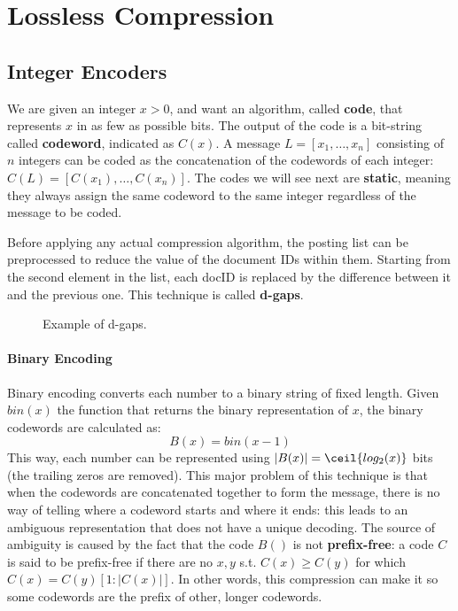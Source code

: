 \section{Lossless Compression}

\subsection{Integer Encoders}

We are given an integer $x > 0$, and want an algorithm, called \textbf{code}, that represents $x$ in as few as possible bits. The output of the code is a bit-string called \textbf{codeword}, indicated as $C(x)$. A message $L = [x_1, \dots , x_n]$ consisting of $n$ integers can be coded as the concatenation of the codewords of each integer: $C(L) = [C(x_1), \dots, C(x_n)]$. The codes we will see next are \textbf{static}, meaning they always assign the same codeword to the same integer regardless of the message to be coded.

Before applying any actual compression algorithm, the posting list can be preprocessed to reduce the value of the document IDs within them. Starting from the second element in the list, each docID is replaced by the difference between it and the previous one. This technique is called \textbf{d-gaps}.
\begin{figure}[!ht]
    \centering 
     
    \caption{Example of d-gaps.}
    \label{fig:dgaps}
\end{figure}

\paragraph{Binary Encoding}
Binary encoding converts each number to a binary string of fixed length. Given $\textit{bin}(x)$ the function that returns the binary representation of $x$, the binary codewords are calculated as:
\begin{equation*}
    B(x) = \textit{bin}(x-1)
\end{equation*}
This way, each number can be represented using $|B(x)| = \ceil{log_2(x)}$ bits (the trailing zeros are removed). This major problem of this technique is that when the codewords are concatenated together to form the message, there is no way of telling where a codeword starts and where it ends: this leads to an ambiguous representation that does not have a unique decoding. The source of ambiguity is caused by the fact that the code $B()$ is not \textbf{prefix-free}: a code $C$ is said to be prefix-free if there are no $x, y$ s.t. $C(x) \geq C(y)$ for which $C(x) = C(y)[1 : |C(x)|]$. In other words, this compression can make it so some codewords are the prefix of other, longer codewords.

